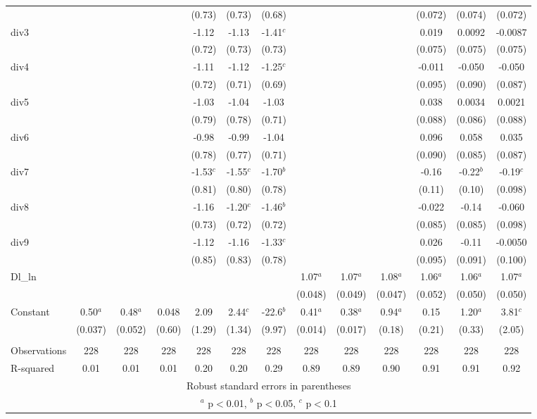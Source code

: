 \documentclass[]{article}
\begin{document}
\begin{tabular}{lcccccccccccc}
 &  &  &  & (0.73) & (0.73) & (0.68) &  &  &  & (0.072) & (0.074) & (0.072) \\
div3 &  &  &  & -1.12 & -1.13 & -1.41$^c$ &  &  &  & 0.019 & 0.0092 & -0.0087 \\
 &  &  &  & (0.72) & (0.73) & (0.73) &  &  &  & (0.075) & (0.075) & (0.075) \\
div4 &  &  &  & -1.11 & -1.12 & -1.25$^c$ &  &  &  & -0.011 & -0.050 & -0.050 \\
 &  &  &  & (0.72) & (0.71) & (0.69) &  &  &  & (0.095) & (0.090) & (0.087) \\
div5 &  &  &  & -1.03 & -1.04 & -1.03 &  &  &  & 0.038 & 0.0034 & 0.0021 \\
 &  &  &  & (0.79) & (0.78) & (0.71) &  &  &  & (0.088) & (0.086) & (0.088) \\
div6 &  &  &  & -0.98 & -0.99 & -1.04 &  &  &  & 0.096 & 0.058 & 0.035 \\
 &  &  &  & (0.78) & (0.77) & (0.71) &  &  &  & (0.090) & (0.085) & (0.087) \\
div7 &  &  &  & -1.53$^c$ & -1.55$^c$ & -1.70$^b$ &  &  &  & -0.16 & -0.22$^b$ & -0.19$^c$ \\
 &  &  &  & (0.81) & (0.80) & (0.78) &  &  &  & (0.11) & (0.10) & (0.098) \\
div8 &  &  &  & -1.16 & -1.20$^c$ & -1.46$^b$ &  &  &  & -0.022 & -0.14 & -0.060 \\
 &  &  &  & (0.73) & (0.72) & (0.72) &  &  &  & (0.085) & (0.085) & (0.098) \\
div9 &  &  &  & -1.12 & -1.16 & -1.33$^c$ &  &  &  & 0.026 & -0.11 & -0.0050 \\
 &  &  &  & (0.85) & (0.83) & (0.78) &  &  &  & (0.095) & (0.091) & (0.100) \\
Dl\_ln &  &  &  &  &  &  & 1.07$^a$ & 1.07$^a$ & 1.08$^a$ & 1.06$^a$ & 1.06$^a$ & 1.07$^a$ \\
 &  &  &  &  &  &  & (0.048) & (0.049) & (0.047) & (0.052) & (0.050) & (0.050) \\
Constant & 0.50$^a$ & 0.48$^a$ & 0.048 & 2.09 & 2.44$^c$ & -22.6$^b$ & 0.41$^a$ & 0.38$^a$ & 0.94$^a$ & 0.15 & 1.20$^a$ & 3.81$^c$ \\
 & (0.037) & (0.052) & (0.60) & (1.29) & (1.34) & (9.97) & (0.014) & (0.017) & (0.18) & (0.21) & (0.33) & (2.05) \\
 &  &  &  &  &  &  &  &  &  &  &  &  \\
Observations & 228 & 228 & 228 & 228 & 228 & 228 & 228 & 228 & 228 & 228 & 228 & 228 \\
 R-squared & 0.01 & 0.01 & 0.01 & 0.20 & 0.20 & 0.29 & 0.89 & 0.89 & 0.90 & 0.91 & 0.91 & 0.92 \\ \hline
\multicolumn{13}{c}{ Robust standard errors in parentheses} \\
\multicolumn{13}{c}{ $^a$ p$<$0.01, $^b$ p$<$0.05, $^c$ p$<$0.1} \\
\end{tabular}
\end{document}

